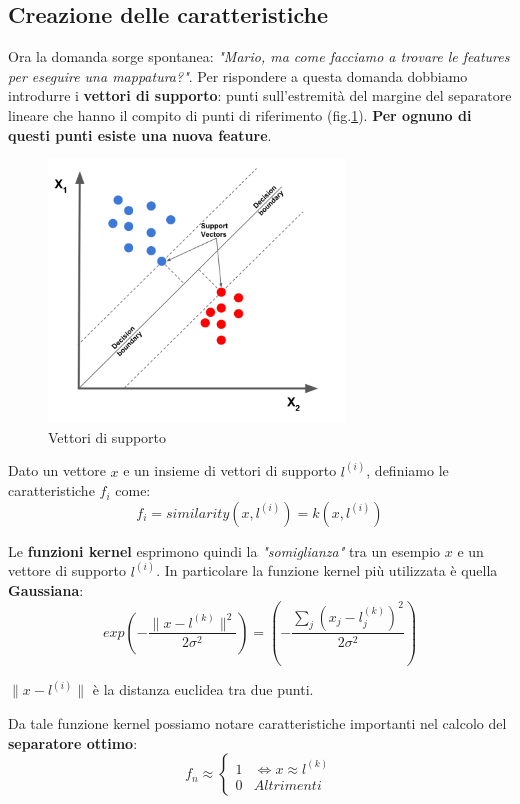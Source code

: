 \subsection{Creazione delle caratteristiche}
Ora la domanda sorge spontanea: \textit{"Mario, ma come facciamo a trovare le features per eseguire una mappatura?"}. Per rispondere a questa domanda dobbiamo introdurre i \textbf{vettori di supporto}: punti sull'estremità del margine del separatore lineare che hanno il compito di punti di riferimento (fig.\ref{supportVector}). \textbf{Per ognuno di questi punti esiste una nuova feature}.
\begin{figure}[H]
    \centering
    \includegraphics[width=0.7\textwidth]{img/supportVector.png}
    \caption{Vettori di supporto}
    \label{supportVector}
\end{figure}
\begin{definizione}
  Dato un vettore $x$ e un insieme di vettori di supporto $l^{(i)}$, definiamo le caratteristiche $f_i$ come:
  \[f_i = similarity(x,l^{(i)}) = k(x,l^{(i)})\]
\end{definizione}
Le \textbf{funzioni kernel} esprimono quindi la \textit{"somiglianza"} tra un esempio $x$ e un vettore di supporto $l^{(i)}$. In particolare la funzione kernel più utilizzata è quella \textbf{Gaussiana}:
  \[ exp\left(-\frac{\lVert x - l^{(k)}\lVert^2}{2\sigma^2}\right) = \left(-\frac{\sum_j(x_j-l_j^{(k)})^2}{2\sigma^2}\right)\]
\begin{nota}
$\lVert x - l^{(i)} \lVert$ è la distanza euclidea tra due punti.
\end{nota}
Da tale funzione kernel possiamo notare caratteristiche importanti nel calcolo del \textbf{separatore ottimo}:
  \[f_n \approx
    \begin{cases}
      1& \iff x \approx l^{(k)} \\
      0& Altrimenti
    \end{cases}
  \]

